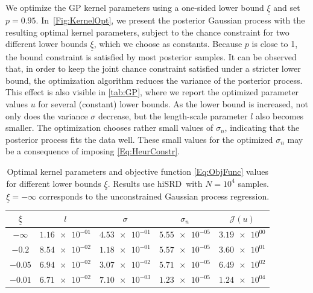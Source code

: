 \documentclass[%
onefignum,onetabnum]{siamonline250211}
\newcommand{\hiSRD}{{\sc hiSRD}}
\begin{document}
We optimize the GP kernel parameters using a one-sided lower bound $\underline{\xi}$ and set $p = 0.95$. In~\cref{Fig:KernelOpt}, we present the posterior Gaussian process with the resulting optimal kernel parameters, subject to the chance constraint for two different lower bounds $\underline{\xi}$, which we choose as constants. Because $p$ is close to 1, the bound constraint is satisfied by most posterior samples. It can be observed that, in order to keep the joint chance constraint satisfied under a stricter lower bound, the optimization algorithm reduces the variance of the posterior process. This effect is also visible in \cref{tab:GP}, where we report the optimized parameter values $u$ for several (constant) lower bounds. As the lower bound is increased, not only does the variance $\sigma$ decrease, but the length-scale parameter $l$ also becomes smaller. The optimization %
chooses rather small values of $\sigma_n$, indicating that the posterior process fits the data well. These small values for the optimized $\sigma_n$ may be a consequence of imposing \eqref{Eq:HeurConstr}.

\begin{table}[htbp]
    \centering
    \caption{Optimal kernel parameters and objective function \eqref{Eq:ObjFunc} values for different lower bounds $\underline \xi$. Results use \hiSRD\ with $N=10^4$ samples. $\underline \xi=-\infty$ corresponds to the unconstrained Gaussian process regression.} \label{tab:GP}
    \begin{tabular}{c|cccc}
        $\underline\xi$ &$l$ &$\sigma$ &$\sigma_n$ & $\mathcal J(u)$ %
        \\[0.2em]
        \hline %
        $-\infty$ & $\num{1.16e-01}$ & $\num{4.53e-01}$ & $\num{5.55e-05}$ & $\num{3.19e+00}$\\[0.2em]
        $-0.2$ & $\num{8.54e-02}$ & $\num{1.18e-01}$ & $\num{5.57e-05}$ & $\num{3.60e+01}$\\[0.2em]
        $-0.05$ & $\num{6.94e-02}$ & $\num{3.07e-02}$ & $\num{5.71e-05}$ & $\num{6.49e+02}$\\[0.2em]
        $-0.01$ & $\num{6.71e-02}$ & $\num{7.10e-03}$ & $\num{1.23e-05}$ & $\num{1.24e+04}$\\[0.2em]
    \end{tabular}
    \label{Table:kernel parameter}
\end{table}
\end{document}
